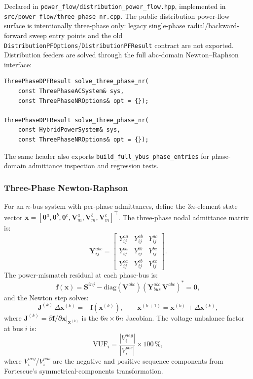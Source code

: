 Declared in \texttt{power\_flow/distribution\_power\_flow.hpp},
implemented in \texttt{src/power\_flow/three\_phase\_nr.cpp}.
The public distribution power-flow surface is intentionally three-phase only:
legacy single-phase radial/backward-forward sweep entry points and the old
\texttt{DistributionPFOptions}/\texttt{DistributionPFResult} contract are not
exported.  Distribution feeders are solved through the full abc-domain
Newton--Raphson interface:
\begin{verbatim}
ThreePhaseDPFResult solve_three_phase_nr(
    const ThreePhaseACSystem& sys,
    const ThreePhaseNROptions& opt = {});

ThreePhaseDPFResult solve_three_phase_nr(
    const HybridPowerSystem& sys,
    const ThreePhaseNROptions& opt = {});
\end{verbatim}
The same header also exports \texttt{build\_full\_ybus\_phase\_entries} for
phase-domain admittance inspection and regression tests.

\subsubsection{Three-Phase Newton-Raphson}

For an $n$-bus system with per-phase admittances, define the $3n$-element
state vector $\mathbf{x} = [\boldsymbol{\theta}^a, \boldsymbol{\theta}^b,
\boldsymbol{\theta}^c, \mathbf{V}_m^a, \mathbf{V}_m^b, \mathbf{V}_m^c]^\top$.
The three-phase nodal admittance matrix is:
\begin{equation}
  \mathbf{Y}^{abc}_{ij} = \begin{bmatrix}
    Y_{ij}^{aa} & Y_{ij}^{ab} & Y_{ij}^{ac} \\
    Y_{ij}^{ba} & Y_{ij}^{bb} & Y_{ij}^{bc} \\
    Y_{ij}^{ca} & Y_{ij}^{cb} & Y_{ij}^{cc}
  \end{bmatrix}.
\end{equation}
The power-mismatch residual at each phase-bus is:
\begin{equation}
  \mathbf{f}(\mathbf{x}) = \mathbf{S}^{inj} - \text{diag}(\mathbf{V}^{abc})
    \left(\mathbf{Y}^{abc}_{bus}\,\mathbf{V}^{abc}\right)^* = \mathbf{0},
\end{equation}
and the Newton step solves:
\begin{equation}
  \mathbf{J}^{(k)}\,\Delta\mathbf{x}^{(k)} = -\mathbf{f}\!\left(\mathbf{x}^{(k)}\right),
  \qquad \mathbf{x}^{(k+1)} = \mathbf{x}^{(k)} + \Delta\mathbf{x}^{(k)},
\end{equation}
where $\mathbf{J}^{(k)} = \partial\mathbf{f}/\partial\mathbf{x}|_{\mathbf{x}^{(k)}}$
is the $6n\times 6n$ Jacobian.  The voltage unbalance factor at bus $i$ is:
\begin{equation}
  \text{VUF}_i = \frac{|V_i^{neg}|}{|V_i^{pos}|}\times 100\,\%,
\end{equation}
where $V_i^{neg}$/$V_i^{pos}$ are the negative and positive sequence
components from Fortescue's symmetrical-components transformation.

